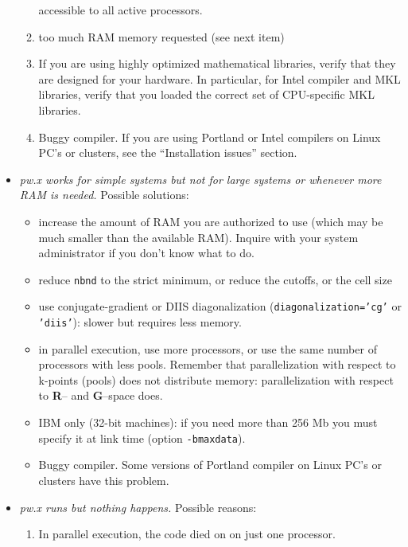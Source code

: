 \documentclass[12pt]{article}
\begin{document}
\begin{itemize}
\begin{enumerate}
         accessible to all active processors.
      \item
         too much RAM memory requested (see next item)
      \item
         If you are using highly optimized mathematical libraries,
         verify that they are designed for your hardware. In particular,
         for Intel compiler and MKL libraries, verify that you
         loaded the correct set of CPU-specific MKL libraries.
      \item
         Buggy compiler. If you are using Portland or Intel compilers
         on Linux PC's or clusters, see the ``Installation issues''
         section.
      \end{enumerate}
\item {\em pw.x works for simple systems but not for large systems
           or whenever more RAM is needed.}
      Possible solutions:
      \begin{itemize}
      \item increase the amount of RAM you are authorized to use
            (which may be much smaller than the available RAM).
            Inquire with your system administrator if you don't
            know what to do.
      \item reduce {\tt nbnd} to the strict minimum, or reduce
            the cutoffs, or the cell size
      \item use conjugate-gradient or DIIS diagonalization
            ({\tt diagonalization='cg'} or {\tt 'diis'}):
            slower but requires less memory.
      \item in parallel execution, use more processors, or use the
            same number of processors with less pools.
            Remember that parallelization with respect to k-points (pools)
            does not distribute memory: parallelization with respect to
            {\bf R}-- and {\bf G}--space does.
      \item IBM only (32-bit machines): if you need more than 256 Mb
            you must specify it
            at link time (option {\tt -bmaxdata}).
      \item Buggy compiler. Some versions of Portland compiler on Linux PC's
            or clusters have this problem.
      \end{itemize}
\item {\em pw.x runs but nothing happens.}
      Possible reasons:
      \begin{enumerate}
      \item
      In parallel execution, the code died on on just one processor. 

\end{enumerate}
\end{itemize}
\end{document}
